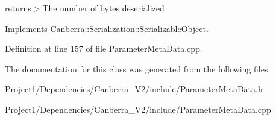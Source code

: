 returns$>$The number of bytes deserialized

Implements \hyperlink{class_canberra_1_1_serialization_1_1_serializable_object}{Canberra\+::\+Serialization\+::\+Serializable\+Object}.



Definition at line 157 of file Parameter\+Meta\+Data.\+cpp.



The documentation for this class was generated from the following files\+:\begin{DoxyCompactItemize}
\item 
Project1/\+Dependencies/\+Canberra\+\_\+\+V2/include/Parameter\+Meta\+Data.\+h\item 
Project1/\+Dependencies/\+Canberra\+\_\+\+V2/include/Parameter\+Meta\+Data.\+cpp\end{DoxyCompactItemize}
